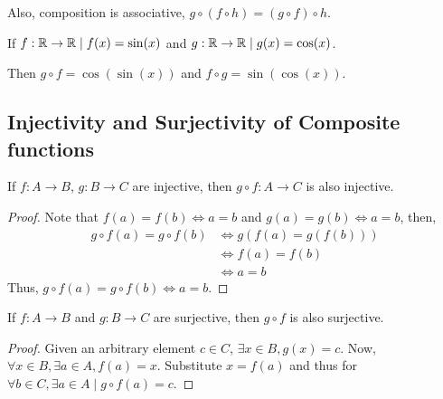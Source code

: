 Also, composition is associative, \(g \circ (f \circ h) = (g \circ f) \circ h\). 

\begin{example}
    If \(f : \mathbb R \to \mathbb R \mid f(x) = \sin(x)\) and \(g : \mathbb R \to \mathbb R \mid g(x) = \cos(x)\).

    Then \(g \circ f = \cos(\sin(x))\) and \(f \circ g = \sin(\cos(x))\). 
\end{example}

\subsection{Injectivity and Surjectivity of Composite functions}

\begin{proposition}
    If \(f : A \to B\), \(g : B \to C\) are injective, then \(g \circ f : A \to C\) is also injective.
\end{proposition}

\begin{proof}
    Note that \(f(a) = f(b) \iff a = b\) and \(g(a) = g(b) \iff a = b\), then,
    \begin{align*}
        g \circ f (a) = g \circ f(b) &\iff g(f(a) = g(f(b)))\\
        &\iff f(a) = f(b) \\
        & \iff a = b 
    \end{align*}  
    Thus, \(g \circ f (a) = g \circ f (b) \iff a = b\).  
\end{proof}

\begin{proposition}
    If \(f : A \to B\) and \(g : B \to C\) are surjective, then \(g \circ f \) is also surjective.
\end{proposition}

\begin{proof}
    Given an arbitrary element \(c \in C\), \(\exists x \in B, g(x) = c\). Now,
    \(\forall x \in B, \exists a \in A, f(a) = x\). Substitute \(x = f(a)\) and thus
    for \(\forall b \in C, \exists a \in A \mid g \circ f (a) = c\).
\end{proof}